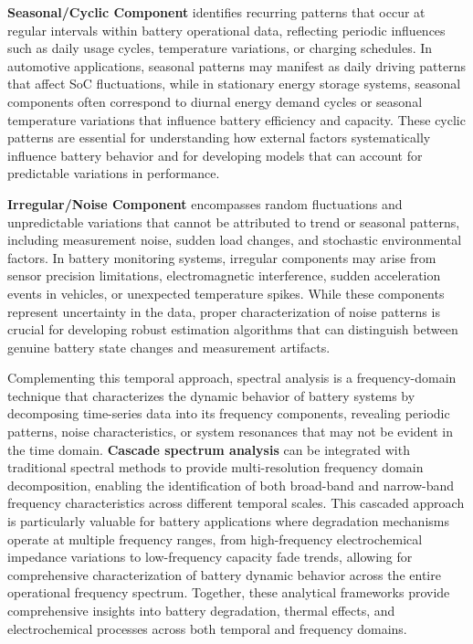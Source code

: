 \textbf{Seasonal/Cyclic Component} identifies recurring patterns that occur at regular intervals within battery operational data, reflecting periodic influences such as daily usage cycles, temperature variations, or charging schedules. In automotive applications, seasonal patterns may manifest as daily driving patterns that affect SoC fluctuations, while in stationary energy storage systems, seasonal components often correspond to diurnal energy demand cycles or seasonal temperature variations that influence battery efficiency and capacity. These cyclic patterns are essential for understanding how external factors systematically influence battery behavior and for developing models that can account for predictable variations in performance.

\textbf{Irregular/Noise Component} encompasses random fluctuations and unpredictable variations that cannot be attributed to trend or seasonal patterns, including measurement noise, sudden load changes, and stochastic environmental factors. In battery monitoring systems, irregular components may arise from sensor precision limitations, electromagnetic interference, sudden acceleration events in vehicles, or unexpected temperature spikes. While these components represent uncertainty in the data, proper characterization of noise patterns is crucial for developing robust estimation algorithms that can distinguish between genuine battery state changes and measurement artifacts.

Complementing this temporal approach, spectral analysis is a frequency-domain technique that characterizes the dynamic behavior of battery systems by decomposing time-series data into its frequency components, revealing periodic patterns, noise characteristics, or system resonances that may not be evident in the time domain. \textbf{Cascade spectrum analysis} can be integrated with traditional spectral methods to provide multi-resolution frequency domain decomposition, enabling the identification of both broad-band and narrow-band frequency characteristics across different temporal scales. This cascaded approach is particularly valuable for battery applications where degradation mechanisms operate at multiple frequency ranges, from high-frequency electrochemical impedance variations to low-frequency capacity fade trends, allowing for comprehensive characterization of battery dynamic behavior across the entire operational frequency spectrum. Together, these analytical frameworks provide comprehensive insights into battery degradation, thermal effects, and electrochemical processes across both temporal and frequency domains.

